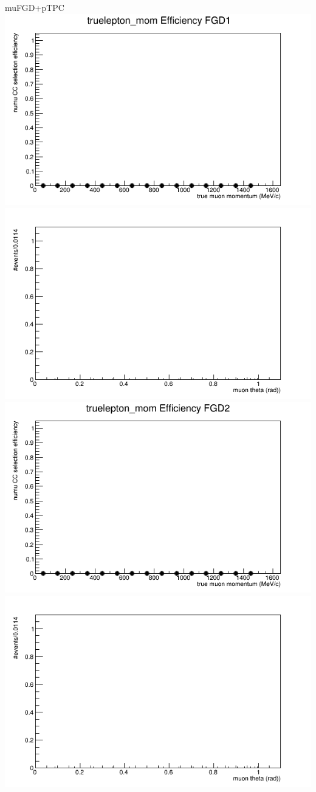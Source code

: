 \documentclass{beamer}
\begin{document}
\begin{frame}{muFGD+pTPC}
\center
\includegraphics[width=.45\textwidth]{images/Eff_truelepton_mom_topology_muFGD+pTPC_accum_level[][0][310]_data_mc.png}
\includegraphics[width=.45\textwidth]{images/Eff_truelepton_costheta_topology_muFGD+pTPC_accum_level[][0][310]_data_mc.png}
\includegraphics[width=.45\textwidth]{images/Eff_truelepton_mom_fgd2topology_muFGD+pTPC_accum_level[][1][310]_data_mc.png}
\includegraphics[width=.45\textwidth]{images/Eff_truelepton_costheta_fgd2topology_muFGD+pTPC_accum_level[][1][310]_data_mc.png}
\end{frame}
\end{document}
